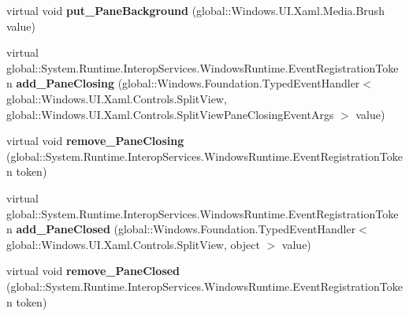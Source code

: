 \begin{DoxyCompactItemize}
\item 
\mbox{\label{class_windows_1_1_u_i_1_1_xaml_1_1_controls_1_1_split_view_a6096724a8ab2470ff7286a1cb40cb0f3}} 
virtual void {\bfseries put\+\_\+\+Pane\+Background} (global\+::\+Windows.\+U\+I.\+Xaml.\+Media.\+Brush value)
\item 
\mbox{\label{class_windows_1_1_u_i_1_1_xaml_1_1_controls_1_1_split_view_a1f06fc0c80e7b9e8814204845dac854c}} 
virtual global\+::\+System.\+Runtime.\+Interop\+Services.\+Windows\+Runtime.\+Event\+Registration\+Token {\bfseries add\+\_\+\+Pane\+Closing} (global\+::\+Windows.\+Foundation.\+Typed\+Event\+Handler$<$ global\+::\+Windows.\+U\+I.\+Xaml.\+Controls.\+Split\+View, global\+::\+Windows.\+U\+I.\+Xaml.\+Controls.\+Split\+View\+Pane\+Closing\+Event\+Args $>$ value)
\item 
\mbox{\label{class_windows_1_1_u_i_1_1_xaml_1_1_controls_1_1_split_view_a7e6d1bbf867167e713891bded6a87a82}} 
virtual void {\bfseries remove\+\_\+\+Pane\+Closing} (global\+::\+System.\+Runtime.\+Interop\+Services.\+Windows\+Runtime.\+Event\+Registration\+Token token)
\item 
\mbox{\label{class_windows_1_1_u_i_1_1_xaml_1_1_controls_1_1_split_view_a97df60d3e67c146b713f4eb1565c5602}} 
virtual global\+::\+System.\+Runtime.\+Interop\+Services.\+Windows\+Runtime.\+Event\+Registration\+Token {\bfseries add\+\_\+\+Pane\+Closed} (global\+::\+Windows.\+Foundation.\+Typed\+Event\+Handler$<$ global\+::\+Windows.\+U\+I.\+Xaml.\+Controls.\+Split\+View, object $>$ value)
\item 
\mbox{\label{class_windows_1_1_u_i_1_1_xaml_1_1_controls_1_1_split_view_a512973422bb0ef5a03c4a96d88f7f082}} 
virtual void {\bfseries remove\+\_\+\+Pane\+Closed} (global\+::\+System.\+Runtime.\+Interop\+Services.\+Windows\+Runtime.\+Event\+Registration\+Token token)
\item 
\mbox{\label{class_windows_1_1_u_i_1_1_xaml_1_1_controls_1_1_split_view_a83623aee98314bfa486d2e3c5b583543}} 

\end{DoxyCompactItemize}

